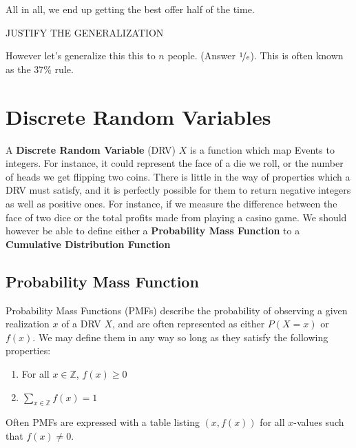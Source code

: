 \documentclass{report}
\begin{document}
\\\\

All in all, we end up getting the best offer half of the time.

\todo JUSTIFY THE GENERALIZATION

However let's generalize this this to $n$ people. (Answer $\nicefrac 1e$). This is often known as the 37\% rule. 


\section{Discrete Random Variables}
A \textbf{Discrete Random Variable} (DRV) $X$ is a function which map Events to integers. For instance, it could represent the face of a die we roll, or the number of heads we get flipping two coins. There is little in the way of properties which a DRV must satisfy, and it is perfectly possible for them to return negative integers as well as positive ones. For instance, if we measure the difference between the face of two dice or the total profits made from playing a casino game. We should however be able to define either a \textbf{Probability Mass Function} to a \textbf{Cumulative Distribution Function}

\subsection{Probability Mass Function}
Probability Mass Functions (PMFs) describe the probability of observing a given realization $x$ of a DRV $X$, and are often represented as either $P(X=x)$ or $f(x)$. We may define them in any way so long as they satisfy the following properties:
\begin{enumerate}
    \item For all $x\in \mathbb Z$, $f(x)\ge 0$
    \item $\displaystyle\sum_{x\in\mathbb Z} f(x)=1$
\end{enumerate}
Often PMFs are expressed with a table listing $(x, f(x))$ for all $x$-values such that $f(x)\ne 0$.
\end{document}
